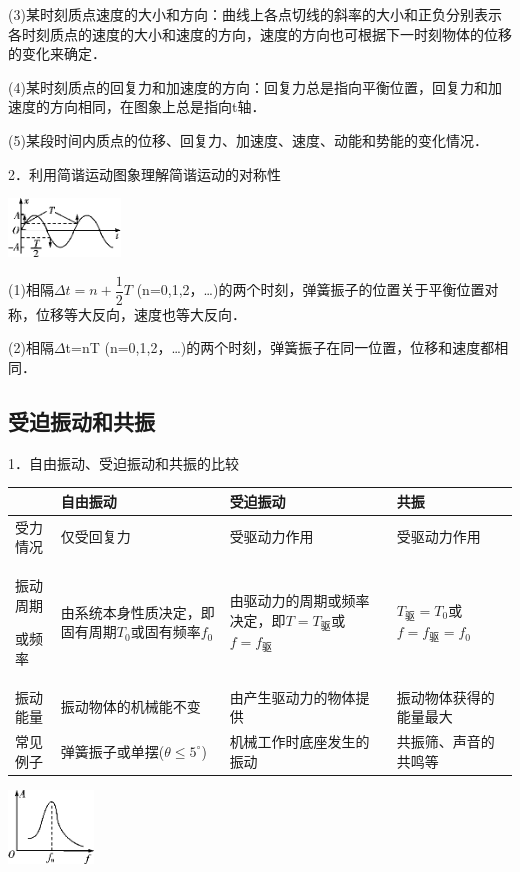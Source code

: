 (3)某时刻质点速度的大小和方向：曲线上各点切线的斜率的大小和正负分别表示各时刻质点的速度的大小和速度的方向，速度的方向也可根据下一时刻物体的位移的变化来确定．

(4)某时刻质点的回复力和加速度的方向：回复力总是指向平衡位置，回复力和加速度的方向相同，在图象上总是指向t轴．

(5)某段时间内质点的位移、回复力、加速度、速度、动能和势能的变化情况．

2．利用简谐运动图象理解简谐运动的对称性

\begin{center}\includegraphics[width=1.17917in,height=0.61319in]{media/image517.png}\end{center}

(1)相隔$\Delta t=n+\dfrac{1}{2}T$
(n=0,1,2，\ldots)的两个时刻，弹簧振子的位置关于平衡位置对称，位移等大反向，速度也等大反向．

(2)相隔$\Delta$t=nT
(n=0,1,2，\ldots)的两个时刻，弹簧振子在同一位置，位移和速度都相同．

\newpage
\subsection{受迫振动和共振}

1．自由振动、受迫振动和共振的比较

\begin{longtable}[]{@{}m{2cm}m{3cm}m{3cm}m{3cm}@{}}
\toprule
&
自由振动
&
受迫振动
&
共振
\tabularnewline
\midrule
\endhead
受力情况 & 仅受回复力 & 受驱动力作用 & 受驱动力作用\tabularnewline
振动周期

或频率
&
由系统本身性质决定，即固有周期$T_0$或固有频率$f_0$
&
由驱动力的周期或频率决定，即$T=T_\text{驱}$或$f=f_\text{驱}$
&
$T_\text{驱}=T_0$或$f=f_\text{驱}=f_0$
\tabularnewline
振动能量 & 振动物体的机械能不变 & 由产生驱动力的物体提供 &
振动物体获得的能量最大\tabularnewline
常见例子 & 弹簧振子或单摆($\theta \leq 5^\circ$) & 机械工作时底座发生的振动 &
共振筛、声音的共鸣等\tabularnewline
\bottomrule
\end{longtable}

\begin{center}\includegraphics[width=0.89653in,height=0.77361in]{media/image519.png}\end{center}

